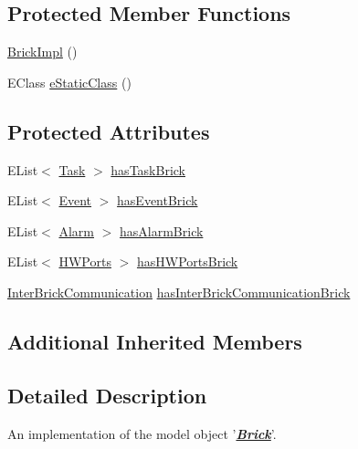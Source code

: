 \subsection*{Protected Member Functions}
\begin{DoxyCompactItemize}
\item 
\hyperlink{classshootingmachineemfmodel_1_1impl_1_1_brick_impl_ab864ec8e7a2244a893b3f0cd5053ddd3}{Brick\-Impl} ()
\item 
E\-Class \hyperlink{classshootingmachineemfmodel_1_1impl_1_1_brick_impl_ad74b2984ba5a457c19e984162e0f7e3f}{e\-Static\-Class} ()
\end{DoxyCompactItemize}
\subsection*{Protected Attributes}
\begin{DoxyCompactItemize}
\item 
E\-List$<$ \hyperlink{interfaceshootingmachineemfmodel_1_1_task}{Task} $>$ \hyperlink{classshootingmachineemfmodel_1_1impl_1_1_brick_impl_ad74e2edddf418ebc84b4b86103c990f7}{has\-Task\-Brick}
\item 
E\-List$<$ \hyperlink{interfaceshootingmachineemfmodel_1_1_event}{Event} $>$ \hyperlink{classshootingmachineemfmodel_1_1impl_1_1_brick_impl_a82cd434d746a251a4cabe6d97f7b90d2}{has\-Event\-Brick}
\item 
E\-List$<$ \hyperlink{interfaceshootingmachineemfmodel_1_1_alarm}{Alarm} $>$ \hyperlink{classshootingmachineemfmodel_1_1impl_1_1_brick_impl_a158f1f9b48ea9f93fdb6d4b6a9162ca3}{has\-Alarm\-Brick}
\item 
E\-List$<$ \hyperlink{interfaceshootingmachineemfmodel_1_1_h_w_ports}{H\-W\-Ports} $>$ \hyperlink{classshootingmachineemfmodel_1_1impl_1_1_brick_impl_abec72f296d414bf500aa27132358c6ef}{has\-H\-W\-Ports\-Brick}
\item 
\hyperlink{interfaceshootingmachineemfmodel_1_1_inter_brick_communication}{Inter\-Brick\-Communication} \hyperlink{classshootingmachineemfmodel_1_1impl_1_1_brick_impl_a23bf733c1d11dffe70e782aa69d5b1d4}{has\-Inter\-Brick\-Communication\-Brick}
\end{DoxyCompactItemize}
\subsection*{Additional Inherited Members}


\subsection{Detailed Description}
An implementation of the model object '{\itshape {\bfseries \hyperlink{interfaceshootingmachineemfmodel_1_1_brick}{Brick}}}'.

